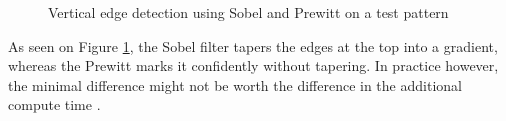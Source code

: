 \documentclass[twoside,a4paper,article]{combine}
\begin{document}
\begin{minipage}{\textwidth}\begin{figure}[H]
    \captionsetup{justification=centering}
    \centering
    \caption{Vertical edge detection using Sobel and Prewitt on a test pattern}\label{fig:pattern}
\end{figure}\end{minipage}

As seen on Figure \ref{fig:pattern}, the Sobel filter tapers the edges at the top into a gradient, whereas the Prewitt marks it confidently without tapering. In practice however,
the minimal difference might not be worth the difference in the additional compute time \cite{NIXON2020141}.
\end{document}
